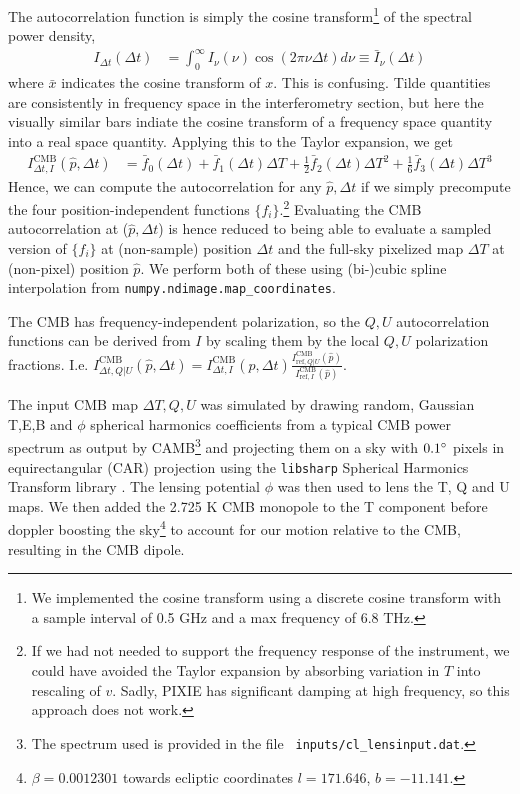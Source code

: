 \documentclass{article}
\newcommand{\code}[1]{\texttt{#1}}
\begin{document}
The autocorrelation function is simply the cosine transform\footnote{
We implemented the cosine transform using a discrete cosine transform with a
sample interval of 0.5 GHz and a max frequency of 6.8 THz.} of the spectral power
density,
\begin{align}
	I_{\Delta t}(\Delta t) &= \int_{0}^\infty I_\nu(\nu) \cos(2\pi\nu\Delta t) d\nu
	\equiv \bar I_\nu(\Delta t)
\end{align}
where $\bar{x}$ indicates the cosine transform of $x$.
{\color{red}This is confusing. Tilde quantities are consistently
in frequency space in the interferometry section, but here the visually
similar bars indiate the cosine transform of a frequency space quantity
into a real space quantity.}
Applying this to the Taylor expansion, we get
\begin{align}
I^\textrm{CMB}_{\Delta t,I}(\hat p,\Delta t) &= \bar f_0(\Delta t) + \bar f_1(\Delta t) \Delta T + \frac12 \bar f_2(\Delta t) \Delta T^2 + \frac16 \bar f_3(\Delta t) \Delta T^3
\end{align}
Hence, we can compute the autocorrelation for any $\hat p,\Delta t$ if we simply precompute
the four position-independent functions $\{f_i\}$.\footnote{
If we had not needed to support the frequency response of the instrument,
we could have avoided the Taylor expansion by absorbing variation in $T$
into rescaling of $v$. Sadly, PIXIE has significant damping at high frequency,
so this approach does not work.} Evaluating the CMB autocorrelation at ($\hat p,\Delta t$)
is hence reduced to being able to evaluate a sampled version of $\{f_i\}$
at (non-sample) position $\Delta t$ and
the full-sky pixelized map $\Delta T$ at (non-pixel) position $\hat p$.
We perform both of these using (bi-)cubic spline interpolation
from \code{numpy.ndimage.map\_coordinates}.

The CMB has frequency-independent polarization,
so the $Q,U$ autocorrelation functions can be derived from $I$ by scaling them by
the local $Q,U$ polarization fractions. I.e. $I^\textrm{CMB}_{\Delta t,Q|U}(\hat p,\Delta t) = I^\textrm{CMB}_{\Delta t,I}(\hat p,\Delta t) \frac{I^\textrm{CMB}_{\textrm{ref},Q|U}(\hat p)}{I^\textrm{CMB}_{\textrm{ref},I}(\hat p)}$.

The input CMB map $\Delta T,Q,U$ was simulated by drawing random, Gaussian
T,E,B and $\phi$ spherical harmonics coefficients from a typical CMB power spectrum
as output by CAMB\footnote{The spectrum used is provided in the file \code{
	inputs/cl\_lensinput.dat}.} and projecting them on a sky with $0.1\degree$
pixels in equirectangular (CAR) projection using the \code{libsharp} Spherical
Harmonics Transform library \cite{libsharp}. The lensing potential $\phi$ was then used to
lens the T, Q and U maps. We then added the 2.725 K CMB monopole to the T
component before doppler boosting the sky\footnote{$\beta=0.0012301$ towards
ecliptic coordinates $l=171.646$, $b=-11.141$.}
to account for our motion relative to the CMB, resulting in the CMB dipole.
\end{document}
